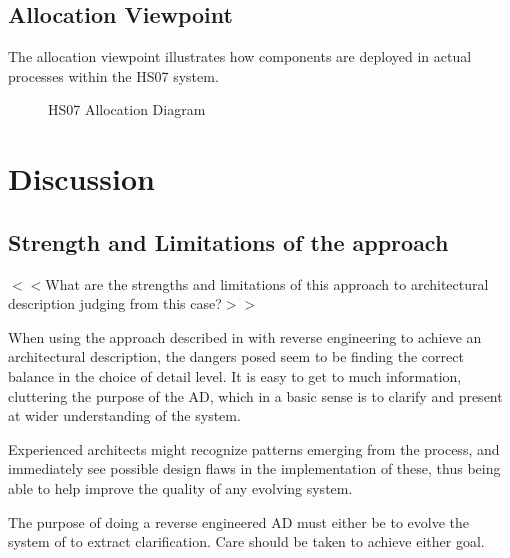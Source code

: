 \documentclass[a4paper,10pt]{article}
\begin{document}
\subsection{Allocation Viewpoint}

The allocation viewpoint illustrates how components are deployed in actual processes
within the HS07 system.

\begin{figure}[!htb]
\caption{HS07 Allocation Diagram}
\label{fig:allocation}
\end{figure}


\section{Discussion}
\subsection{Strength and Limitations of the approach}
$<<$What are the strengths and limitations of this approach to
architectural description judging from this case?$>>$

When using the approach described in \cite{christensen2004archdesc} with reverse 
engineering to achieve an architectural description, the dangers posed seem to 
be finding the correct balance in the choice of detail level. It
is easy to get to much information, cluttering the purpose of the 
AD, which in a basic sense is to clarify and present at wider understanding of
the system.

Experienced architects might recognize patterns emerging from the process, and 
immediately see possible design flaws in the implementation of these, thus
being able to help improve the quality of any evolving system.

The purpose of doing a reverse engineered AD must either be to evolve
the system of to extract clarification. Care should be taken to achieve either
goal. 
\end{document}
